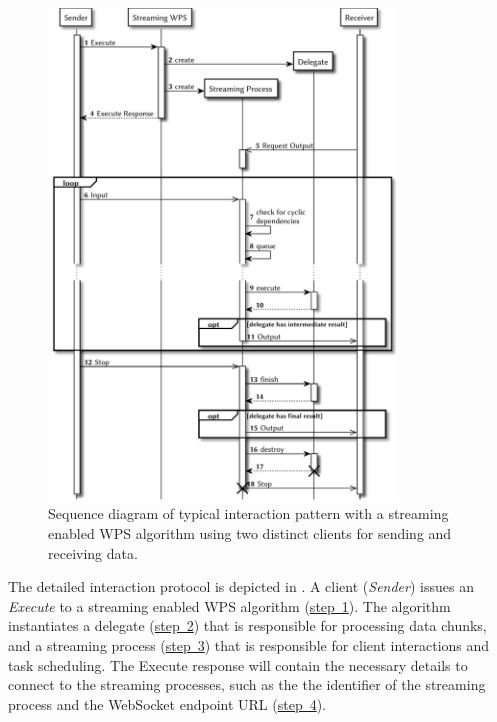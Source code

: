 		\begin{figure}[!htb]
			\centering
			\includegraphics[width=0.82253521126760565\textwidth]{figures/sequence-diagramm-swps.pdf}
			\caption{\label{fig:sd:swps}Sequence diagram of typical interaction pattern with a streaming enabled WPS algorithm using two distinct clients for sending and receiving data.}
		\end{figure}

		The detailed interaction protocol is depicted in . A client (\emph{Sender}) issues an \emph{Execute} to a streaming enabled WPS algorithm (\hyperref[fig:sd:swps]{step~1}). The algorithm instantiates a delegate (\hyperref[fig:sd:swps]{step~2}) that is responsible for processing data chunks, and a streaming process (\hyperref[fig:sd:swps]{step~3}) that is responsible for client interactions and task scheduling. The Execute response will contain the necessary details to connect to the streaming processes, such as the the identifier of the streaming process and the WebSocket endpoint URL (\hyperref[fig:sd:swps]{step~4}).

